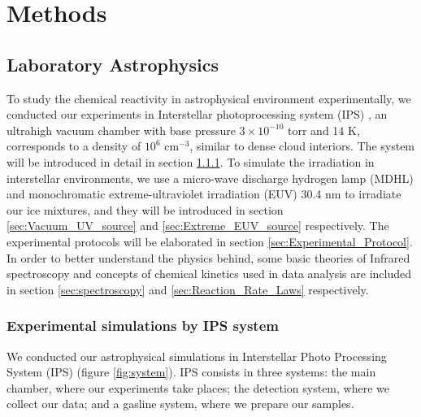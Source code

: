 \chapter{\protect Methods}
\label{methods}

\section{Laboratory Astrophysics}
To study the chemical reactivity in astrophysical environment experimentally,
we conducted our experiments in Interstellar photoprocessing system (IPS) \cite{chen2013vacuum},
an ultrahigh vacuum chamber with base pressure $3 \times 10^{-10}$ torr and 14 K,
corresponds to a density of $10^6$ cm$^{-3}$, similar to dense cloud interiors.
The system will be introduced in detail in section \ref{sec:IPS_system}.
To simulate the irradiation in interstellar environments,
we use a micro-wave discharge hydrogen lamp (MDHL) and monochromatic extreme-ultraviolet irradiation (EUV) 30.4 nm to irradiate our ice mixtures,
and they will be introduced in section \ref{sec:Vacuum_UV_source} and \ref{sec:Extreme_EUV_source} respectively.
The experimental protocols will be elaborated in section \ref{sec:Experimental_Protocol}.
In order to better understand the physics behind, some basic theories of Infrared spectroscopy and concepts of chemical kinetics used in data analysis are included in section \ref{sec:spectroscopy} and \ref{sec:Reaction_Rate_Laws} respectively.\\

\subsection{Experimental simulations by IPS system}
\label{sec:IPS_system}

We conducted our astrophysical simulations in Interstellar Photo Processing System (IPS) (figure \ref{fig:system}). IPS consists in three systems: the main chamber, where our experiments take places; the detection system, where we collect our data; and a gasline system, where we prepare our samples.

